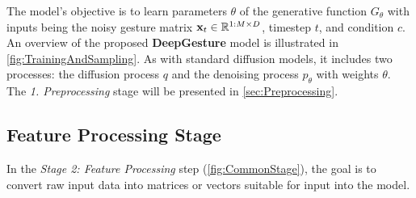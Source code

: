 The model's objective is to learn parameters $\theta$ of the generative function $G_{\theta}$ with inputs being the noisy gesture matrix $\mathbf{x}_t \in \mathbb{R}^{1:M \times D}$, timestep $t$, and condition $c$. An overview of the proposed \textbf{DeepGesture} model is illustrated in \autoref{fig:TrainingAndSampling}. As with standard diffusion models, it includes two processes: the diffusion process $q$ and the denoising process $p_{\theta}$ with weights $\theta$. The \textit{1. Preprocessing} stage will be presented in \autoref{sec:Preprocessing}.


\subsection{Feature Processing Stage}

In the \textit{Stage 2: Feature Processing} step (\autoref{fig:CommonStage}), the goal is to convert raw input data into matrices or vectors suitable for input into the model.

